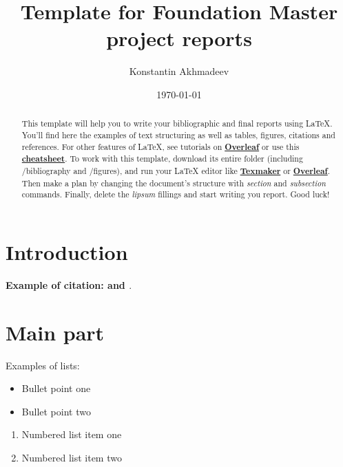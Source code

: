\documentclass[12pt]{article}
\begin{document}
\title{Template for Foundation Master project reports} %
\author{Konstantin Akhmadeev}
\date{\today} %
\maketitle %



\begin{abstract}
This template will help you to write your bibliographic and final reports using \LaTeX{}. You'll find here the examples of text structuring as well as tables, figures, citations and references. For other features of \LaTeX, see tutorials on \href{https://www.overleaf.com/learn}{\textbf{Overleaf}} or use this \href{https://wch.github.io/latexsheet/}{\textbf{cheatsheet}}. To work with this template, download its entire folder (including /bibliography and /figures), and run your \LaTeX{}  editor like \href{http://www.xm1math.net/texmaker/}{\textbf{Texmaker}} or \href{https://www.overleaf.com}{\textbf{Overleaf}}. Then make a plan by changing the document's structure with \textit{section} and \textit{subsection} commands. Finally, delete the \textit{lipsum} fillings and start writing you report. Good luck!
\end{abstract}


\section{Introduction}

\textbf{Example of citation: \cite{Smith_2013} and \cite{Smith_2012}}. \lipsum[2]

\section{Main part}
\label{S:1}
\lipsum[9]

Examples of lists:
\begin{itemize}
\item Bullet point one
\item Bullet point two
\end{itemize}

\begin{enumerate}
\item Numbered list item one
\item Numbered list item two
\end{enumerate}
\end{document}
